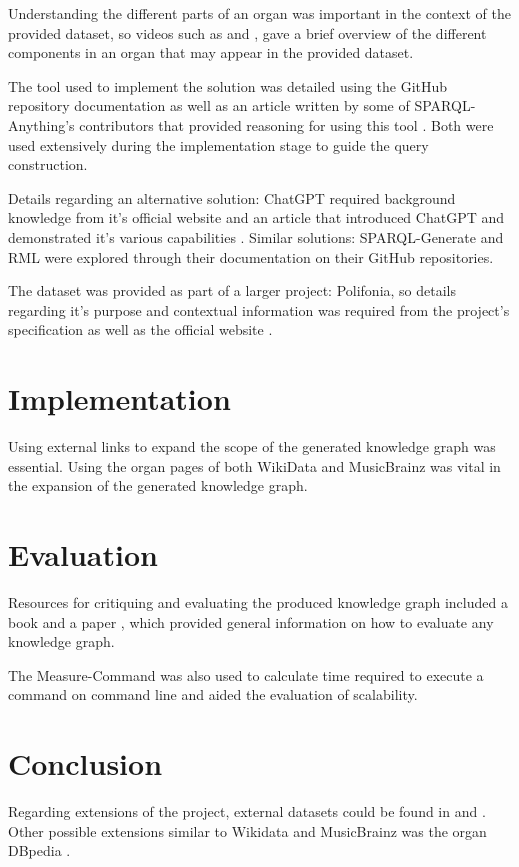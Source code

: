 Understanding the different parts of an organ was important in the context of the provided dataset, so videos such as \cite{organvideo} and \cite{organvideo1}, gave a brief overview of the different components in an organ that may appear in the provided dataset. 

The tool used to implement the solution was detailed using the GitHub repository documentation \cite{sparqlanythinggithub} as well as an article written by some of SPARQL-Anything's contributors that provided reasoning for using this tool \cite{sparqlanything}. Both were used extensively during the implementation stage to guide the query construction. 

Details regarding an alternative solution: ChatGPT required background knowledge from it's official website \cite{chatgptwebsite} and an article that introduced ChatGPT and demonstrated it's various capabilities \cite{chatgpt}. Similar solutions: SPARQL-Generate \cite{sparqlgenerate} and RML \cite{rml} were explored through their documentation on their GitHub repositories.

The dataset was provided as part of a larger project: Polifonia, so details regarding it's purpose and contextual information was required from the project's specification \cite{polifoniaproject} as well as the official website \cite{polifonia}. 

\section{Implementation}
\hspace{0.5cm} Using external links to expand the scope of the generated knowledge graph was essential. Using the organ pages of both WikiData \cite{organwikidata} and MusicBrainz \cite{organmusicbrainz} was vital in the expansion of the generated knowledge graph. 

\section{Evaluation}
\hspace{0.5cm} Resources for critiquing and evaluating the produced knowledge graph included a book \cite{knowledgegraphevaulationbook} and a paper \cite{evaluationpaper}, which provided general information on how to evaluate any knowledge graph. 

The Measure-Command \cite{measurecommand} was also used to calculate time required to execute a command on command line and aided the evaluation of scalability. 

\section{Conclusion}
\hspace{0.5cm} Regarding extensions of the project, external datasets could be found in \cite{kaggle} and \cite{googledatasetsearch}. Other possible extensions similar to Wikidata and MusicBrainz was the organ DBpedia \cite{organdbpedia}.